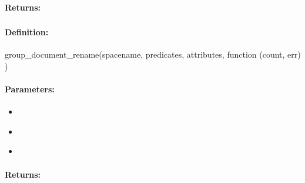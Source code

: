 \paragraph{Returns:}


\pagebreak
\subsubsection{}
\label{api:nodejs:group_document_rename}


\paragraph{Definition:}
\begin{javascriptcode}
group_document_rename(spacename, predicates, attributes, function (count, err) {})
\end{javascriptcode}
\paragraph{Parameters:}
\begin{itemize}[noitemsep]
\item {}\\

\item {}\\

\item {}\\

\end{itemize}

\paragraph{Returns:}


\pagebreak
\subsubsection{}
\label{api:nodejs:document_rename}


